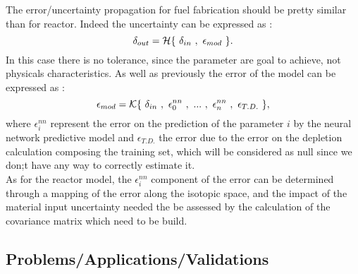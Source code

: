 \documentclass[dvips,12pt]{article}
\begin{document}
The error/uncertainty propagation for fuel fabrication should be pretty similar than for reactor. Indeed the uncertainty can be expressed as :
\begin{equation}
\delta_{out} = {\cal H}\{~\delta _{in}~,~\epsilon_{mod}~\}.
\end{equation}
In this case there is no tolerance, since the parameter are goal to achieve, not physicals characteristics. As well as previously the error of the model can be expressed as :
\begin{equation}
\epsilon_{mod} = {\cal K}\{~\delta _{in}~,~\epsilon^{nn}_{0}~,~...~,~\epsilon^{nn}_{n}~,~\epsilon_{T.D.}~\},
\end{equation}
 where $\epsilon^{nn}_{i}$ represent the error on the prediction of the parameter $i$ by the neural network predictive model and $\epsilon_{T.D.}$ the error due to the error on the depletion calculation composing the training set, which will be considered as null since we don;t have any way to correctly estimate it.\\
 
 As for the reactor model, the $\epsilon^{nn}_{i}$ component of the error can be determined through a mapping of the error along the isotopic space, and the impact of the material input uncertainty needed the be assessed by the calculation of the covariance matrix which need to be build.

\subsection{Problems/Applications/Validations}
\end{document}
